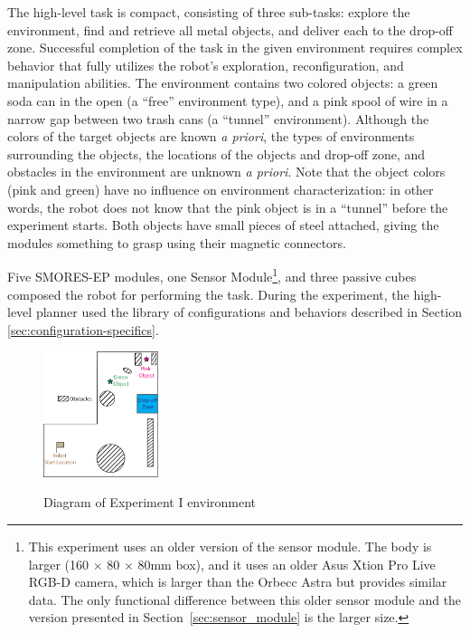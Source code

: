\documentclass[journal]{IEEEtran}
\begin{document}
The high-level task is compact, consisting of three sub-tasks: explore the environment, find and retrieve all metal objects, and deliver each to the drop-off zone.  Successful completion of the task in the given environment requires complex behavior that fully utilizes the robot's exploration, reconfiguration, and manipulation abilities. The environment contains two colored objects: a green soda can in the open (a ``free'' environment type), and a pink spool of wire in a narrow gap between two trash cans (a ``tunnel'' environment). Although the colors of the target objects are known \textit{a priori}, the types of environments surrounding the objects, the locations of the objects and drop-off zone, and obstacles in the environment are unknown \textit{a priori}.  Note that the object colors (pink and green) have no influence on environment characterization: in other words, the robot does not know that the pink object is in a ``tunnel''  before the experiment starts.  Both objects have small pieces of steel attached, giving the modules something to grasp using their magnetic connectors.

Five SMORES-EP modules, one Sensor Module\footnote{This experiment uses an older version of the sensor module.  The body is larger (160 $\times$ 80 $\times$ 80mm box), and it uses an older Asus Xtion Pro Live RGB-D camera, which is larger than the Orbecc Astra but provides similar data.  The only functional difference between this older sensor module and the version presented in Section~\ref{sec:sensor_module} is the larger size.}, and three passive cubes composed the robot for performing the task. 
During the experiment, the high-level planner used the library of configurations and behaviors described in Section \ref{sec:configuration-specifics}.

\begin{figure}
\begin{center}
\includegraphics[width=0.3\textwidth]{images/RSSMap.png}
\caption{Diagram of Experiment I environment}
\vspace{-4em}
\label{fig:map}
\end{center}
\end{figure}
\end{document}
